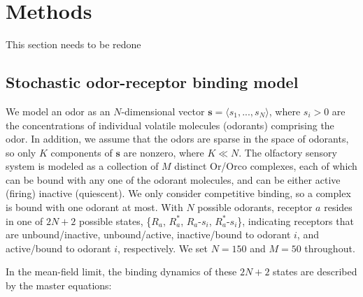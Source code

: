 \section{Methods}

{\color {blue} This section needs to be redone}

\subsection{Stochastic odor-receptor binding model}

We model an odor as an $N$-dimensional vector $\mathbf s = \langle s_1,...,s_N\rangle$, where $s_i > 0$ are the concentrations of individual volatile molecules (odorants) comprising the odor. In addition, we assume that the odors are sparse in the space of odorants, so only $K$ components of $\mathbf s$ are nonzero, where $K \ll N$. The olfactory sensory system is modeled as a collection of $M$ distinct Or/Orco complexes, each of which can be bound with any one of the odorant molecules, and can be either active (firing) inactive (quiescent). We only consider competitive binding, so a complex is bound with one odorant at most. With $N$ possible odorants, receptor $a$ resides in one of $2N+2$ possible states, \{$R_a$, $R^*_a$, $R_a$-$s_i$, $R^*_a$-$s_i$\}, indicating receptors that are unbound/inactive, unbound/active, inactive/bound to odorant $i$, and active/bound to odorant $i$, respectively. We set $N = 150$ and $M = 50$ throughout.

In the mean-field limit, the binding dynamics of these $2N + 2$ states are described by the master equations:

